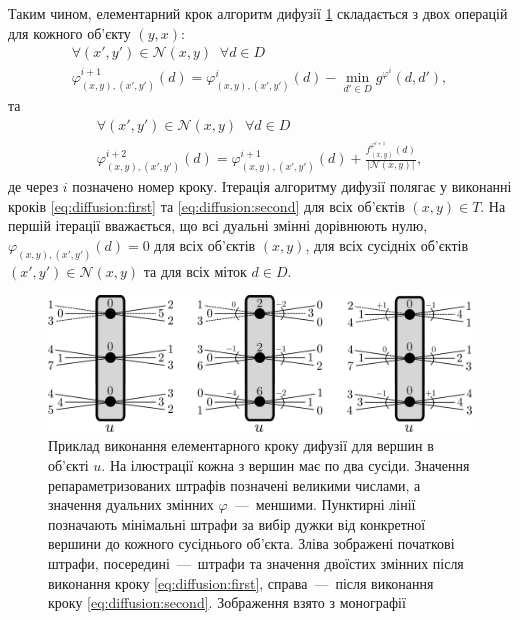 Таким чином, елементарний крок алгоритм дифузії \ref{fig:diffusion:step}
складається з двох операцій для кожного об'єкту $\left(y, x \right)$:
\begin{equation}\label{eq:diffusion:first}
\begin{gathered}
    \forall \left( x', y' \right) \in \mathcal{N} \left(x, y\right) \; \;
    \forall d \in D \\
    \varphi_{\left(x, y \right), \left(x', y' \right)}^{i + 1} \left( d \right)
    = \varphi_{\left(x, y \right), \left(x', y' \right)}^i \left( d \right)
    - \min \limits_{d' \in D}
        g^{\varphi^i} \left(d, d' \right),
\end{gathered}
\end{equation}
та
\begin{equation}\label{eq:diffusion:second}
\begin{gathered}
    \forall \left( x', y' \right) \in \mathcal{N} \left(x, y\right) \; \;
    \forall d \in D \\
    \varphi_{\left(x, y \right), \left(x', y' \right)}^{i + 2} \left( d \right)
    = \varphi_{\left(x, y \right), \left(x', y' \right)}^{i + 1} \left( d \right)
    + \frac{f_{\left(x, y \right)}^{\varphi^{i + 1}} \left(d \right)}{\left| \mathcal{N} \left(x, y \right)\right|},
\end{gathered}
\end{equation}
де через $i$ позначено номер кроку.
Ітерація алгоритму дифузії полягає у виконанні кроків \eqref{eq:diffusion:first}
та \eqref{eq:diffusion:second} для всіх об'єктів $\left( x, y \right) \in T$.
На першій ітерації вважається, що всі дуальні змінні дорівнюють нулю,
$\varphi_{\left(x, y \right), \left(x', y' \right)} \left( d \right) = 0$
для всіх об'єктів $\left(x, y \right)$,
для всіх сусідніх об'єктів
$\left(x', y' \right) \in \mathcal{N} \left(x, y \right)$
та для всіх міток $d \in D$.

\begin{figure}[h]
  \centering
  \includegraphics[width=\textwidth]{images/diffusion_step}
  \caption{Приклад виконання елементарного кроку дифузії для вершин в об'єкті $u$.
           На ілюстрації кожна з вершин має по два сусіди.
           Значення репараметризованих штрафів позначені великими числами,
           а значення дуальних змінних $\varphi$~---~меншими.
           Пунктирні лінії позначають мінімальні штрафи за вибір
           дужки від конкретної вершини до кожного сусіднього об'єкта.
           Зліва зображені початкові штрафи,
           посередині~---~штрафи та значення
           двоїстих змінних після виконання кроку \eqref{eq:diffusion:first},
           справа~---~після виконання кроку \eqref{eq:diffusion:second}.
           Зображення взято з монографії \cite{overview:savchynskyy:diffusion}}
  \label{fig:diffusion:step}
\end{figure}

